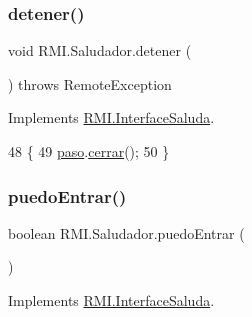 \subsubsection{\texorpdfstring{detener()}{detener()}}
{\footnotesize\ttfamily void R\+M\+I.\+Saludador.\+detener (\begin{DoxyParamCaption}{ }\end{DoxyParamCaption}) throws Remote\+Exception\hspace{0.3cm}{\ttfamily [inline]}}



Implements \mbox{\hyperlink{interface_r_m_i_1_1_interface_saluda_a271848a330c374eb0f6f5157cc2b60c6}{R\+M\+I.\+Interface\+Saluda}}.


\begin{DoxyCode}
48     \{
49         \mbox{\hyperlink{class_r_m_i_1_1_saludador_acf8f2452f97fd371135558ba37283fa4}{paso}}.\mbox{\hyperlink{class_r_m_i_1_1_paso_a94a5334985d909a4db0b5efda2f68a9f}{cerrar}}();
50     \}
\end{DoxyCode}
\mbox{\label{class_r_m_i_1_1_saludador_a1fc26b10a1968a3d7080adf3acf37718}} 
\subsubsection{\texorpdfstring{puedo\+Entrar()}{puedoEntrar()}}
{\footnotesize\ttfamily boolean R\+M\+I.\+Saludador.\+puedo\+Entrar (\begin{DoxyParamCaption}{ }\end{DoxyParamCaption})\hspace{0.3cm}{\ttfamily [inline]}}



Implements \mbox{\hyperlink{interface_r_m_i_1_1_interface_saluda_afbc3db469b848c5a90bbf10ebc20823f}{R\+M\+I.\+Interface\+Saluda}}.


